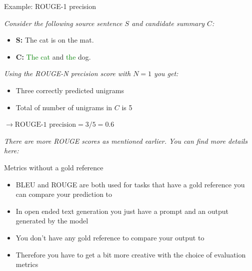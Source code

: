\documentclass[11pt,compress,t,notes=noshow, xcolor=table]{beamer}
\begin{document}
\begin{vbframe}{Example: ROUGE-1 precision}

\vfill
\textit{Consider the following source sentence $S$ and candidate summary $C$:}

\begin{itemize}
    \item \textbf{S:} The cat is on the mat.
    \item \textbf{C:} \textcolor{green}{The cat} and \textcolor{green}{the} dog.
\end{itemize}

\textit{Using the ROUGE-N precision score with $N = 1$ you get:}

\begin{itemize}
    \item Three correctly predicted unigrams
    \item Total of number of unigrams in $C$ is 5
\end{itemize}

$\rightarrow \text{ROUGE-1 precision}=3/5 = 0.6$

\textit{There are more ROUGE scores as mentioned earlier. You can find more details here:} 
\vfill
    
\end{vbframe}

\begin{vbframe}{Metrics without a gold reference}

\vfill

\begin{itemize}
    \item BLEU and ROUGE are both used for tasks that have a gold reference you can compare your prediction to
    \item In open ended text generation you just have a prompt and an output generated by the model
    \item You don't have any gold reference to compare your output to
    \item Therefore you have to get a bit more creative with the choice of evaluation metrics
\end{itemize}

\vfill
    
\end{vbframe}

\end{document}
